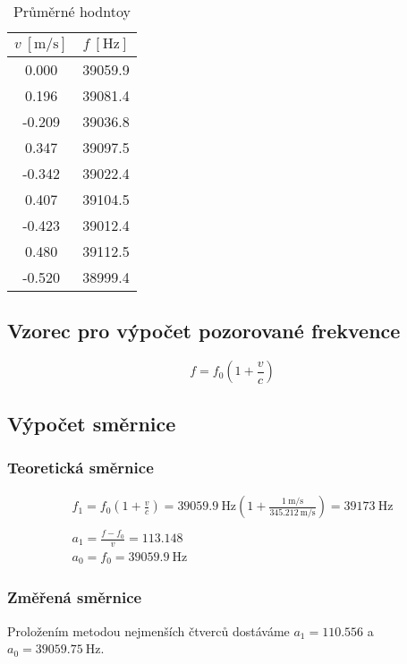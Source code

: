 \documentclass[a4paper,10pt]{article}
\begin{document}
\begin{table}[!ht]
    \centering
    \begin{tabular}{|c|c|}
        $v\ [\si{\meter\per\second}]$ & $f\ [\si{\hertz}]$ \\ \hline
        0.000 & 39059.9 \\
        0.196 & 39081.4 \\
        -0.209 & 39036.8 \\
        0.347 & 39097.5 \\
        -0.342 & 39022.4 \\
        0.407 & 39104.5 \\
        -0.423 & 39012.4 \\
        0.480 & 39112.5 \\
        -0.520 & 38999.4 \\
    \end{tabular}
    \caption{Průměrné hodntoy}
\end{table}
\subsection{Vzorec pro výpočet pozorované frekvence}
\begin{equation}
 f = f_0 (1 + \frac{v}{c})
\end{equation}

\subsection{Výpočet směrnice}
\subsubsection{Teoretická směrnice}
\begin{gather*}
f_1 = f_0 (1+\frac{v}{c}) = 39059.9\ \si{\hertz} (1 + \frac{1\ \si{\meter\per\second}}{345.212\ \si{\meter\per\second}}) = 39173\ \si{\hertz}\\
\\
a_1 = \frac{f-f_0}{v} = 113.148\\
a_0 = f_0 = 39059.9\ \si{\hertz}
\end{gather*}

\subsubsection{Změřená směrnice}
Proložením metodou nejmenších čtverců dostáváme $a_1 = 110.556$ a $a_0 = 39059.75\ \si{\hertz}$.
\end{document}
